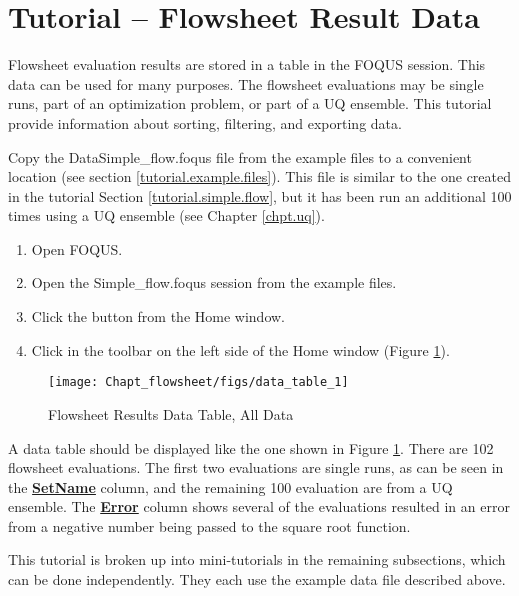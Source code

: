 \section{Tutorial -- Flowsheet Result Data}\label{tutorials.fs.data}

Flowsheet evaluation results are stored in a table in the FOQUS session. This data can be used for many purposes.  The flowsheet evaluations may be single runs, part of an optimization problem, or part of a UQ ensemble. This tutorial provide information about sorting, filtering, and exporting data.

Copy the Data\bs Simple\_flow.foqus file from the example files to a convenient location (see section \ref{tutorial.example.files}).  This file is similar to the one created in the tutorial Section \ref{tutorial.simple.flow}, but it has been run an additional 100 times using a UQ ensemble (see Chapter \ref{chpt.uq}).

\begin{enumerate}
	\item Open FOQUS.
	\item Open the Simple\_flow.foqus session from the example files.
	\item Click the  button from the Home window.
	\item Click  in the toolbar on the left side of the Home window (Figure \ref{fig.data.table1}).
\end{enumerate}

\begin{figure}[H]
	\begin{center}
		\texttt{[image: Chapt\_flowsheet/figs/data\_table\_1]}
		\caption{Flowsheet Results Data Table, All Data}
		\label{fig.data.table1}
	\end{center}
\end{figure}

A data table should be displayed like the one shown in Figure \ref{fig.data.table1}.  There are 102 flowsheet evaluations.  The first two evaluations are single runs, as can be seen in the \textbf{\underline{SetName}} column, and the remaining 100 evaluation are from a UQ ensemble.  The \textbf{\underline{Error}} column shows several of the evaluations resulted in an error from a negative number being passed to the square root function.

This tutorial is broken up into mini-tutorials in the remaining subsections, which can be done independently.  They each use the example data file described above.

